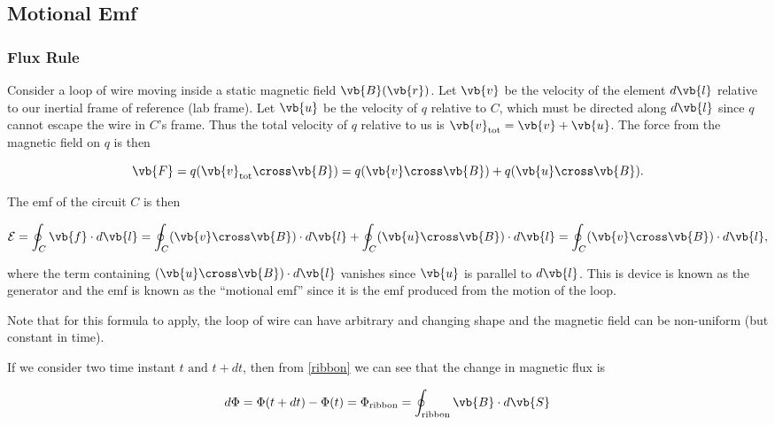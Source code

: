 \documentclass[english,a4paper,12pt]{report}
\begin{document}
\subsection{Motional Emf}
\subsubsection{Flux Rule}
Consider a loop of wire moving inside a static magnetic field \(\vb{B} (\vb{r} )\). Let \(\vb{v} \) be the velocity of the element \(d \vb{l} \) relative to our inertial frame of reference (lab frame). Let \(\vb{u}\) be the velocity of \(q\) relative to \(C\), which must be directed along \(d \vb{l} \) since \(q\) cannot escape the wire in \(C\)'s frame. Thus the total velocity of \(q\) relative to us is \(\vb{v} _{\text{tot} } = \vb{v} + \vb{u} \). The force from the magnetic field on \(q\) is then

\begin{equation}
    \vb{F} = q(\vb{v} _{\text{tot} } \cross \vb{B} ) = q (\vb{v} \cross \vb{B} ) + q (\vb{u} \cross \vb{B} ).
\end{equation}

The emf of the circuit \(C\) is then 

\begin{equation}
    \mathcal{E} = \oint_{C} \vb{f} \cdot d \vb{l} = \oint_{C} (\vb{v} \cross \vb{B} ) \cdot d \vb{l}  + \oint_{C} (\vb{u} \cross \vb{B} ) \cdot d \vb{l} = \oint_{C} (\vb{v} \cross \vb{B} ) \cdot d \vb{l} ,
\end{equation}

where the term containing \((\vb{u} \cross \vb{B} )\cdot d\vb{l} \) vanishes since \(\vb{u}\) is parallel to \(d \vb{l} \). This is device is known as the generator and the emf is known as the ``motional emf'' since it is the emf produced from the motion of the loop.

Note that for this formula to apply, the loop of wire can have arbitrary and changing shape and the magnetic field can be non-uniform (but constant in time). 

If we consider two time instant \(t \text { and } t+dt\), then from \cref{ribbon} we can see that the change in magnetic flux is


\begin{equation}
    d\Phi = \Phi (t+dt) - \Phi (t) = \Phi _{\text{ribbon}} = \oint_{\text{ribbon} } \vb{B} \cdot d \vb{S} 
\end{equation}
\end{document}
